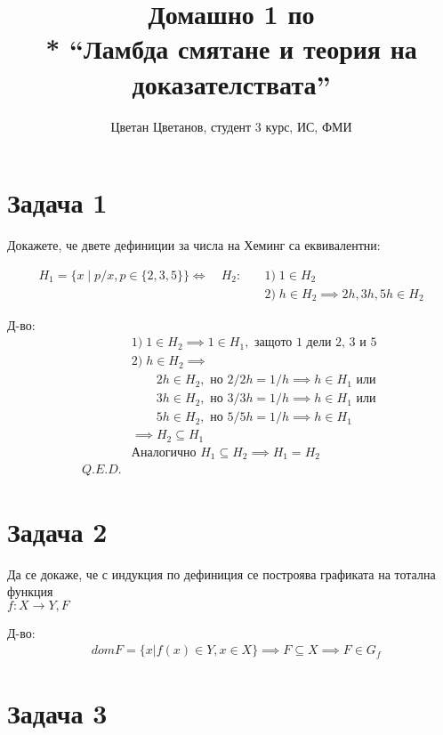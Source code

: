 \documentclass[a4paper]{article}
\title{Домашно 1 по \\* ``Ламбда смятане и теория на доказателствата''}
\author{Цветан Цветанов, студент 3 курс, ИС, ФМИ}
\begin{document}
\maketitle
\thispagestyle{empty}
\newpage

\section*{Задача 1}

Докажете, че двете дефиниции за числа на Хеминг са еквивалентни:

\begin{align*}
H_{1} = \{ x \mid p/x, p \in \{2, 3, 5\}\} \iff \quad H_{2}: \quad & 1)\; 1 \in H_{2} \\
                                                                   & 2)\; h \in H_{2} \implies 2h, 3h, 5h \in H_{2}
\end{align*}

Д-во:
\begin{align*}
& 1)\; 1 \in H_{2} \implies 1 \in H_{1}, \text{ защото 1 дели 2, 3 и 5 } \\
& 2)\; h \in H_{2} \implies \\ 
      & \qquad 2h \in H_{2}, \text{ но } 2/2h = 1/h \implies h \in H_{1} \text{ или} \\
      & \qquad 3h \in H_{2}, \text{ но } 3/3h = 1/h \implies h \in H_{1} \text{ или} \\
      & \qquad 5h \in H_{2}, \text{ но } 5/5h = 1/h \implies h \in H_{1} \\
      & \implies H_{2} \subseteq H_{1} \\
& \text{Аналогично } H_{1} \subseteq H_{2} \implies H_{1} = H_{2} \\
Q.E.D.
\end{align*}

\section*{Задача 2}

Да се докаже, че с индукция по дефиниция се построява графиката на тотална функция \\
$f : X \rightarrow Y, F$

Д-во:
\begin{align*}
& dom F = \{ x | f(x) \in Y, x \in X \} \implies F \subseteq X \implies F \in G_f
\end{align*}

\section*{Задача 3}
\end{document}
